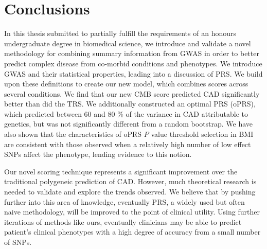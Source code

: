 \chapter{Conclusions}

In this thesis submitted to partially fulfill the requirements of an honours undergraduate degree in biomedical science, we introduce and validate a novel methodology for combining summary information from \ac{GWAS} in order to better predict complex disease from co-morbid conditions and phenotypes. We introduce \ac{GWAS} and their statistical properties, leading into a discussion of \ac{PRS}. We build upon these definitions to create our new model, which combines scores across several conditions. We find that our new \ac{CMB} score predicted \ac{CAD} significantly better than did the \ac{TRS}. We additionally constructed an optimal \ac{PRS} (\ac{oPRS}), which predicted between 60 and 80 \% of the variance in \ac{CAD} attributable to genetics, but was not significantly different from a random bootstrap. We have also shown that the characteristics of \ac{oPRS} $P$ value threshold selection in \ac{BMI} are consistent with those observed when a relatively high number of low effect \acp{SNP} affect the phenotype, lending evidence to this notion. 

Our novel scoring technique represents a significant improvement over the traditional polygeneic prediction of \ac{CAD}. However, much theoretical research is needed to validate and explore the trends observed. We believe that by pushing further into this area of knowledge, eventually \ac{PRS}, a widely used but often naive methodology, will be improved to the point of clinical utility. Using further iterations of methods like ours, eventually clinicians may be able to predict patient's clinical phenotypes with a high degree of accuracy from a small number of \acp{SNP}.